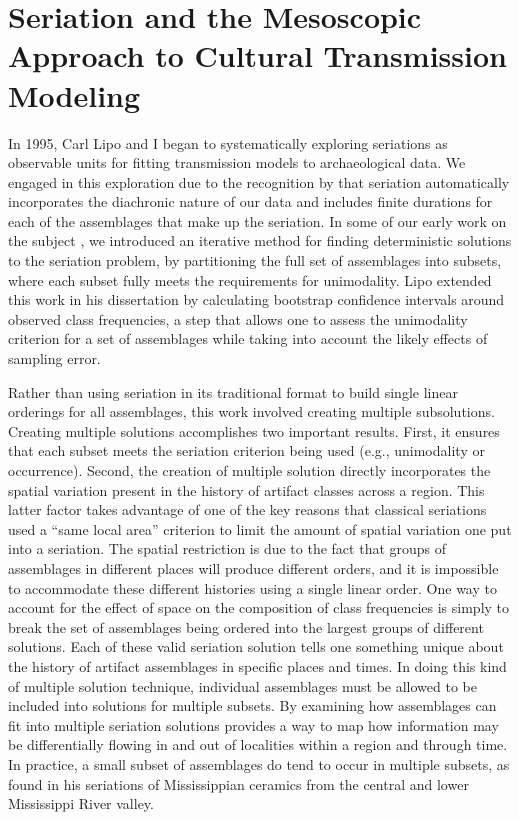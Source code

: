 \section{Seriation and the Mesoscopic Approach to Cultural Transmission Modeling}

In 1995, Carl Lipo and I \citep{huntmadsenlipo1995a,lipomadsenhunt1995b,Lipo1997,Lipo2000,lipomadsen1997,Lipo2001a,Lipo2001} began to systematically exploring seriations as observable units for fitting transmission models to archaeological data.  We engaged in this exploration due to the recognition by \citet{Dunnell1970} that seriation automatically incorporates the diachronic nature of our data and includes finite durations for each of the assemblages that make up the seriation. In some of our early work on the subject , we introduced an iterative method for finding deterministic solutions to the seriation problem, by partitioning the full set of assemblages into subsets, where each subset fully meets the requirements for unimodality.  Lipo extended this work in his dissertation \citep{Lipo2001} by calculating bootstrap confidence intervals around observed class frequencies, a step that allows one to assess the unimodality criterion for a set of assemblages while taking into account the likely effects of sampling error.

Rather than using seriation in its traditional format to build single linear orderings for all assemblages, this work involved creating multiple subsolutions.  Creating multiple solutions accomplishes two important results. First, it ensures that each subset meets the seriation criterion being used (e.g., unimodality or occurrence). Second, the creation of multiple solution directly incorporates the spatial variation present in the history of artifact classes across a region. This latter factor takes advantage of one of the key reasons that classical seriations used a “same local area” criterion to limit the amount of spatial variation one put into a seriation.  The spatial restriction is due to the fact that groups of assemblages in different places will produce different orders, and it is impossible to accommodate these different histories using a single linear order.  One way to account for the effect of space on the composition of class frequencies is simply to break the set of assemblages being ordered into the largest groups of different solutions. Each of these valid seriation solution tells one something unique about the history of artifact assemblages in specific places and times. In doing this kind of multiple solution technique, individual assemblages must be allowed to be included into solutions for multiple subsets. By examining how assemblages can fit into multiple seriation solutions provides a way to map how information may be differentially flowing in and out of localities within a region and through time. In practice, a small subset of assemblages do tend to occur in multiple subsets, as \citet{Lipo2001} found in his seriations of Mississippian ceramics from the central and lower Mississippi River  valley.

